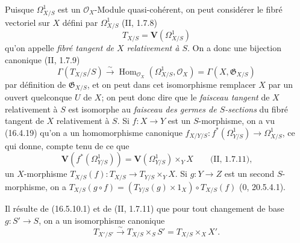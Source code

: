 \begin{env}[16.5.12]
\label{IV.16.5.12}
Puisque $\Omega_{X/S}^1$ est un $\mathcal{O}_X$-Module quasi-cohérent, on peut
considérer le fibré vectoriel sur $X$ défini par $\Omega_{X/S}^1$
(II, 1.7.8)
\[
  T_{X/S}=\mathbf{V}(\Omega_{X/S}^1)
  \tag{16.5.12.1}
  \label{IV.16.5.12.1}
\]
qu'on appelle \emph{fibré tangent de $X$ relativement à $S$}. On a donc une
bijection canonique (II, 1.7.9)
\[
  \Gamma(T_{X/S}/S)\xrightarrow{\sim}
  \operatorname{Hom}_{\mathcal{O}_X}(\Omega_{X/S}^1,\mathcal{O}_X)
  =\Gamma(X,\mathfrak{G}_{X/S})
\]
par définition de $\mathfrak{G}_{X/S}$, et on peut dans cet isomorphisme
remplacer $X$ par un ouvert quelconque $U$ de $X$; on peut donc dire que le
\emph{faisceau tangent} de $X$ relativement à $S$ est isomorphe au
\emph{faisceau des germes de $S$-sections} du fibré tangent de $X$
relativement à $S$. Si $f:X\to Y$ est un $S$-morphisme, on a vu (16.4.19)
qu'on a un homomorphisme canonique
$f_{X/Y/S}:f^*(\Omega_{Y/S}^1)\to\Omega_{X/S}^1$, ce qui donne, compte tenu de
ce que
\[
  \mathbf{V}(f^*(\Omega_{Y/S}^1))
  =\mathbf{V}(\Omega_{Y/S}^1)\times_Y X\qquad\text{(II, 1.7.11),}
\]
un $X$-morphisme
$T_{X/S}(f):T_{X/S}\to T_{Y/S}\times_Y X$. Si $g:Y\to Z$ est un second
$S$-morphisme, on a
$T_{X/S}(g\circ f)=(T_{Y/S}(g)\times1_X)\circ T_{X/S}(f)$ (0, 20.5.4.1).

Il résulte de (16.5.10.1) et de (II, 1.7.11) que pour tout changement de base
$g:S'\to S$, on a un isomorphisme canonique
\[
  T_{X'/S'}\xrightarrow{\sim}T_{X/S}\times_S S'
  =T_{X/S}\times_X X'.
  \tag{16.5.12.2}
  \label{IV.16.5.12.2}
\]
\end{env}

